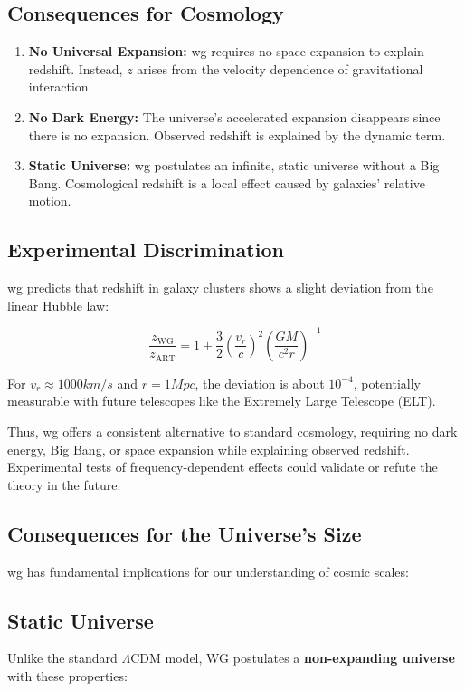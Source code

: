 \subsection{Consequences for Cosmology}
\begin{enumerate}
    \item \textbf{No Universal Expansion:} \gls{wg} requires no space expansion to explain redshift. Instead, $z$ arises from the velocity dependence of gravitational interaction.
    \item \textbf{No Dark Energy:} The universe's accelerated expansion disappears since there is no expansion. Observed redshift is explained by the dynamic term.
    \item \textbf{Static Universe:} \gls{wg} postulates an infinite, static universe without a Big Bang. Cosmological redshift is a local effect caused by galaxies' relative motion.
\end{enumerate}

\subsection{Experimental Discrimination}
\gls{wg} predicts that redshift in galaxy clusters shows a slight deviation from the linear Hubble law:

\begin{equation}
    \frac{z_{\text{WG}}}{z_{\text{ART}}} = 1 + \frac{3}{2} \left( \frac{v_r}{c} \right)^2 \left( \frac{GM}{c^2 r} \right)^{-1}
\end{equation}

For $v_r \approx 1000 km/s$ and $r = 1 Mpc$, the deviation is about $10^{-4}$, potentially measurable with future telescopes like the Extremely Large Telescope (ELT).

Thus, \gls{wg} offers a consistent alternative to standard cosmology, requiring no dark energy, Big Bang, or space expansion while explaining observed redshift.
Experimental tests of frequency-dependent effects could validate or refute the theory in the future.

\subsection{Consequences for the Universe's Size}
\gls{wg} has fundamental implications for our understanding of cosmic scales:

\subsection{Static Universe}
Unlike the standard $\Lambda$CDM model, WG postulates a \textbf{non-expanding universe} with these properties:


